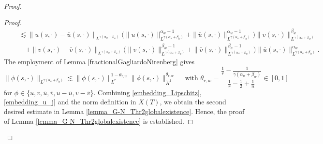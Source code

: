 \documentclass[11pt,reqno]{amsart}
\begin{document}
\begin{proof}
\begin{proof}
\begin{equation}
\begin{aligned}
					&\quad\lesssim \|u(s,\cdot)-\overline u(s,\cdot)\|_{L^{\gamma(\alpha_w+\beta_w)}}\big(\|u(s,\cdot)\|_{L^{\gamma(\alpha_w+\beta_w)}}^{\alpha_w-1}+\|\overline u(s,\cdot)\|_{L^{\gamma(\alpha_w+\beta_w)}}^{\alpha_w-1}\big)\|v(s,\cdot)\|_{L^{\gamma(\alpha_w+\beta_w)}}^{\beta_w}\\
					&\qquad+\|v(s,\cdot)-\overline v(s,\cdot)\|_{L^{\gamma(\alpha_w+\beta_w)}}\big(\|v(s,\cdot)\|_{L^{\gamma(\alpha_w+\beta_w)}}^{\beta_w-1}+\|\overline v(s,\cdot)\|_{L^{\gamma(\alpha_w+\beta_w)}}^{\beta_w-1}\big)\|\overline u(s,\cdot)\|_{L^{\gamma(\alpha_w+\beta_w)}}^{\alpha_w}.
				\end{aligned}
			\end{equation}
			The employment of Lemma \ref{fractionalGagliardoNirenberg} gives
			\begin{equation}\label{embedding_u_j}
				\|\phi(s,\cdot)\|_{L^{\gamma(\alpha_w+\beta_w)}}\lesssim
				\|\phi(s,\cdot)\|_{L^r}^{1-\theta_{r,w}}
				\|\phi(s,\cdot)\|_{\dot{H}^1}^{\theta_{r,w}} \quad\text{ with } 
				\theta_{r,w}=\frac{\frac{1}{r}-\frac{1}{\gamma(\alpha_w+\beta_w)}}{\frac{1}{r}-\frac{1}{2}+\frac{1}{n}} \in [0,1]
			\end{equation}
			for $\phi\in\{u,v,\overline u,\overline v,u-\overline u,v-\overline v\}$. Combining \eqref{embedding_Lipschitz}, \eqref{embedding_u_j} and the norm definition in $X(T)$, we obtain the second desired estimate in Lemma \ref{lemma_G-N_Thr2globalexistence}. Hence, the proof of Lemma \ref{lemma_G-N_Thr2globalexistence} is established.
		\end{proof}
		

\end{proof}
\end{document}
